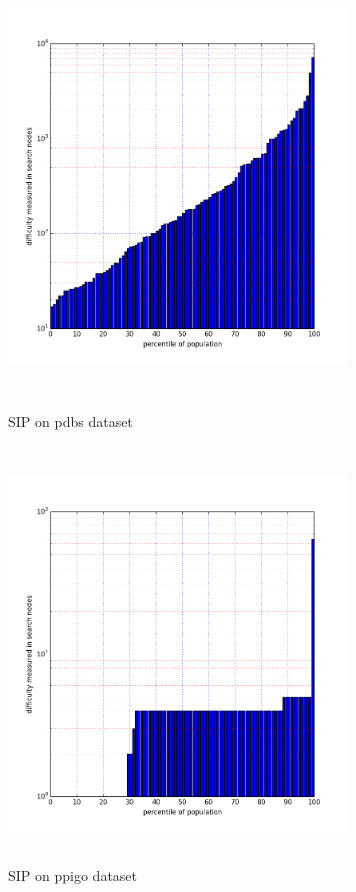 \documentclass{l4proj}
\begin{document}
\begin{figure}
\centering
\begin{minipage}[t]{.5\textwidth}
  \centering
  \includegraphics[height=11cm,width=9cm]{images/plots/pdbsPercentileLog.png}
  \caption{SIP on pdbs dataset}
  \label{pdbsNodes}
\end{minipage}%
\begin{minipage}[t]{.5\textwidth}
  \centering
  \includegraphics[height=11cm,width=9cm]{images/plots/ppigoPercentileLog.png}
  \caption{SIP on ppigo dataset}
  \label{ppigoNodes}
\end{minipage}
\end{figure}
\end{document}
